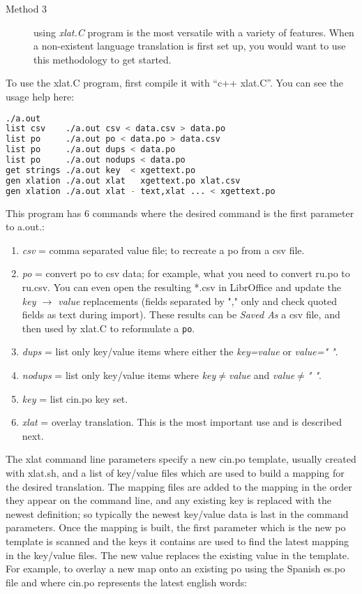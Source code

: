 \begin{description}
	\item[Method 3 ] using \textit{xlat.C} program is the most versatile with a variety of features.  When a non-existent language translation is first set up, you would want to use this methodology to get started.
\end{description}

To use the xlat.C program, first compile it with “c++ xlat.C”.  You can see the usage help here:

\begin{lstlisting}[language=bash,numbers=none]
	./a.out 
list csv    ./a.out csv < data.csv > data.po
list po     ./a.out po < data.po > data.csv
list po     ./a.out dups < data.po
list po     ./a.out nodups < data.po
get strings ./a.out key  < xgettext.po
gen xlation ./a.out xlat   xgettext.po xlat.csv
gen xlation ./a.out xlat - text,xlat ... < xgettext.po
\end{lstlisting}

This program has 6 commands where the desired command is the first parameter to a.out.:

\begin{enumerate}
	\item \textit{csv} = comma separated value file; to recreate a po from a csv file.
	\item \textit{po}  = convert po to csv data;  for example, what you need to convert ru.po to ru.csv.
	You can even open the resulting *.csv in LibrOffice and update the \textit{key $\rightarrow$ value} replacements
	(fields separated by "," only and check quoted fields as text during import).  These results can
	be \textit{Saved As} a csv file, and then used by xlat.C to reformulate a \texttt{po}.
	\item \textit{dups} = list only key/value items where either the \textit{key=value} or \textit{value=" "}.
	\item \textit{nodups} = list only key/value items where \textit{key$\ne$value} and \textit{value$\ne$" "}.
	\item \textit{key} = list cin.po key set.
	\item \textit{xlat} = overlay translation.  This is the most important use and is described next.
\end{enumerate}

The xlat command line parameters specify a new cin.po template, usually created with xlat.sh, and a list of key/value files which are used to build a mapping for the desired translation.  The mapping files are added to the mapping in the order they appear on the command line, and any existing key is replaced with the newest definition; so typically the newest key/value data is last in the command parameters.  
Once the mapping is built, the first parameter which is the new po template is scanned and the keys it contains are used to find the latest mapping in the key/value files.  The new value replaces the existing value in the template.  For example, to overlay a new map onto an existing po using the Spanish es.po file and where cin.po represents the latest english words:

